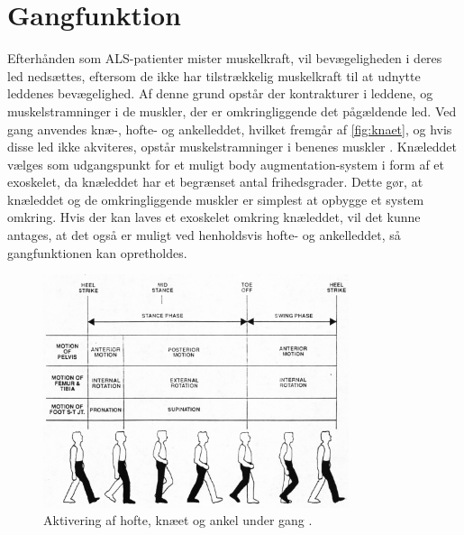 \section{Gangfunktion}
Efterhånden som ALS-patienter mister muskelkraft, vil bevægeligheden i deres led nedsættes, eftersom de ikke har tilstrækkelig muskelkraft til at udnytte leddenes bevægelighed. Af denne grund opstår der kontrakturer i leddene, og muskelstramninger i de muskler, der er omkringliggende det pågældende led. Ved gang anvendes knæ-, hofte- og ankelleddet, hvilket fremgår af \autoref{fig:knaet}, og hvis disse led ikke akviteres, opstår muskelstramninger i benenes muskler \citep{instforms2008}. Knæleddet vælges som udgangspunkt for et muligt body augmentation-system i form af et exoskelet, da knæleddet har et begrænset antal frihedsgrader. Dette gør, at knæleddet og de omkringliggende muskler er simplest at opbygge et system omkring. Hvis der kan laves et exoskelet omkring knæleddet, vil det kunne antages, at det også er muligt ved henholdsvis hofte- og ankelleddet, så gangfunktionen kan opretholdes.

\begin{figure} [H]
\centering
\includegraphics[width=0.8\textwidth]{figures/knaet}
\caption{Aktivering af hofte, knæet og ankel under gang \citep{orthopedics2016}.}
\label{fig:knaet}
\end{figure} 

